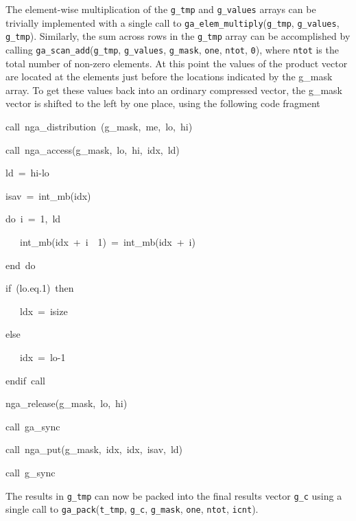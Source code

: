 The element-wise multiplication of the \texttt{g\_tmp} and \texttt{g\_values}
arrays can be trivially implemented with a single call to \texttt{ga\_elem\_multiply}(\texttt{g\_tmp},
\texttt{g\_values},\texttt{ g\_tmp}). Similarly, the sum across rows
in the \texttt{g\_tmp} array can be accomplished by calling \texttt{ga\_scan\_add}(\texttt{g\_tmp},
\texttt{g\_values}, \texttt{g\_mask}, \texttt{one}, \texttt{ntot},
\texttt{0}), where \texttt{ntot} is the total number of non-zero elements.
At this point the values of the product vector are located at the
elements just before the locations indicated by the g\_mask array.
To get these values back into an ordinary compressed vector, the g\_mask
vector is shifted to the left by one place, using the following code
fragment
\begin{lyxcode}
call~nga\_distribution~(g\_mask,~me,~lo,~hi)~

call~nga\_access(g\_mask,~lo,~hi,~idx,~ld)~

ld~=~hi-lo~

isav~=~int\_mb(idx)~

do~i~=~1,~ld~

~~~int\_mb(idx~+~i~\textendash{}~1)~=~int\_mb(idx~+~i)~

end~do~

if~(lo.eq.1)~then~

~~~ldx~=~isize~

else~

~~~idx~=~lo-1~

endif~call~

nga\_release(g\_mask,~lo,~hi)~

call~ga\_sync~

call~nga\_put(g\_mask,~idx,~idx,~isav,~ld)~

call~g\_sync
\end{lyxcode}
The results in \texttt{g\_tmp} can now be packed into the final results
vector \texttt{g\_c} using a single call to \texttt{ga\_pack}(\texttt{t\_tmp},
\texttt{g\_c}, \texttt{g\_mask}, \texttt{one}, \texttt{ntot}, \texttt{icnt}). 
